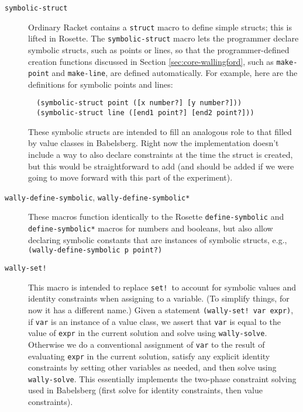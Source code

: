 \documentclass{article}
\begin{document}
\begin{description}

\item[{\tt symbolic-struct}] Ordinary Racket contains a \verb|struct| macro
  to define simple structs; this is lifted in Rosette.  The
  \verb|symbolic-struct| macro lets the programmer declare symbolic
  structs, such as points or lines, so that the programmer-defined creation
  functions discussed in Section \ref{sec:core-wallingford}, such as
  \verb|make-point| and \verb|make-line|, are defined automatically.
  For example, here are the definitions for symbolic points and lines:
  \begin{verbatim}
  (symbolic-struct point ([x number?] [y number?]))
  (symbolic-struct line ([end1 point?] [end2 point?]))
  \end{verbatim}
These symbolic structs are intended to fill an analogous role to that
filled by value classes in Babelsberg.  Right now the implementation
doesn't include a way to also declare constraints at the time the
struct is created, but this would be straightforward to add (and
should be added if we were going to move forward with this part of the
experiment). 

\item[{\tt wally-define-symbolic}, {\tt wally-define-symbolic*}] These
  macros function identically to the Rosette \verb|define-symbolic| and
  \verb|define-symbolic*| macros for numbers and booleans, but also allow
  declaring symbolic constants that are instances of symbolic structs,
  e.g., \verb|(wally-define-symbolic p point?)|

\item[{\tt wally-set!}] This macro is intended to replace
  \verb|set!|~to account for symbolic values and identity constraints
  when assigning to a variable.  (To simplify things, for now it has a
  different name.)  Given a statement \verb|(wally-set! var expr)|, if
  \verb|var| is an instance of a value class, we assert that
  \verb|var| is equal to the value of \verb|expr| in the current
  solution and solve using \verb|wally-solve|.  Otherwise we do a
  conventional assignment of \verb|var| to the result of evaluating
  \verb|expr| in the current solution, satisfy any explicit identity
  constraints by setting other variables as needed, and then solve
  using \verb|wally-solve|.  This essentially implements the two-phase
  constraint solving used in Babelsberg (first solve for identity
  constraints, then value constraints).

\end{description}
\end{document}
